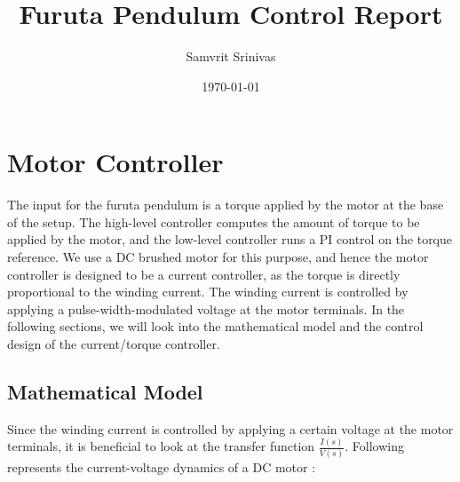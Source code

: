 \documentclass{report}
\title{Furuta Pendulum Control Report}
\author{Samvrit Srinivas}
\date{\today}
\begin{document}
\maketitle

\chapter{Motor Controller} \label{chap:motor_controller}

The input for the furuta pendulum is a torque applied by the motor at the base of the setup. The high-level controller computes the amount of torque to be applied by the motor, and the low-level controller runs a PI control on the torque reference. We use a DC brushed motor for this purpose, and hence the motor controller is designed to be a current controller, as the torque is directly proportional to the winding current. The winding current is controlled by applying a pulse-width-modulated voltage at the motor terminals. In the following sections, we will look into the mathematical model and the control design of the current/torque controller.

\section{Mathematical Model}	\label{sec:math_model}

Since the winding current is controlled by applying a certain voltage at the motor terminals, it is beneficial to look at the transfer function $\frac{I(s)}{V(s)}$. Following represents the current-voltage dynamics of a DC motor \cite{motor_control_umich_lecture}:\\
\end{document}
